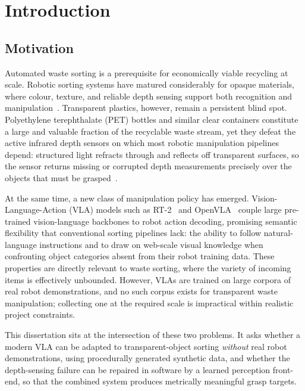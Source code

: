 \chapter{Introduction}
\label{ch:introduction}

\section{Motivation}
\label{sec:motivation}

Automated waste sorting is a prerequisite for economically viable recycling at scale. Robotic sorting systems have matured considerably for opaque materials, where colour, texture, and reliable depth sensing support both recognition and manipulation~\citep{koskinopoulou2021, lubongo2024}. Transparent plastics, however, remain a persistent blind spot. Polyethylene terephthalate (PET) bottles and similar clear containers constitute a large and valuable fraction of the recyclable waste stream, yet they defeat the active infrared depth sensors on which most robotic manipulation pipelines depend: structured light refracts through and reflects off transparent surfaces, so the sensor returns missing or corrupted depth measurements precisely over the objects that must be grasped~\citep{sajjan2020}.

At the same time, a new class of manipulation policy has emerged. Vision-Language-Action (VLA) models such as RT-2~\citep{zitkovich2023} and OpenVLA~\citep{kim2024} couple large pre-trained vision-language backbones to robot action decoding, promising semantic flexibility that conventional sorting pipelines lack: the ability to follow natural-language instructions and to draw on web-scale visual knowledge when confronting object categories absent from their robot training data. These properties are directly relevant to waste sorting, where the variety of incoming items is effectively unbounded. However, VLAs are trained on large corpora of real robot demonstrations, and no such corpus exists for transparent waste manipulation; collecting one at the required scale is impractical within realistic project constraints.

This dissertation sits at the intersection of these two problems. It asks whether a modern VLA can be adapted to transparent-object sorting \emph{without} real robot demonstrations, using procedurally generated synthetic data, and whether the depth-sensing failure can be repaired in software by a learned perception front-end, so that the combined system produces metrically meaningful grasp targets.

